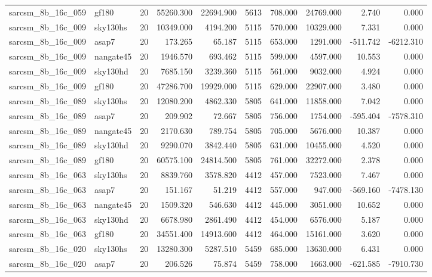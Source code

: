 \documentclass{article}
\begin{document}
\begin{longtable}{llrrrrrrrr}
sarcsm\_8b\_16c\_059 & gf180 & 20 & 55260.300 & 22694.900 & 5613 & 708.000 & 24769.000 & 2.740 & 0.000 \\
sarcsm\_8b\_16c\_009 & sky130hs & 20 & 10349.000 & 4194.200 & 5115 & 570.000 & 10329.000 & 7.331 & 0.000 \\
sarcsm\_8b\_16c\_009 & asap7 & 20 & 173.265 & 65.187 & 5115 & 653.000 & 1291.000 & -511.742 & -6212.310 \\
sarcsm\_8b\_16c\_009 & nangate45 & 20 & 1946.570 & 693.462 & 5115 & 599.000 & 4597.000 & 10.553 & 0.000 \\
sarcsm\_8b\_16c\_009 & sky130hd & 20 & 7685.150 & 3239.360 & 5115 & 561.000 & 9032.000 & 4.924 & 0.000 \\
sarcsm\_8b\_16c\_009 & gf180 & 20 & 47286.700 & 19929.000 & 5115 & 629.000 & 22907.000 & 3.480 & 0.000 \\
sarcsm\_8b\_16c\_089 & sky130hs & 20 & 12080.200 & 4862.330 & 5805 & 641.000 & 11858.000 & 7.042 & 0.000 \\
sarcsm\_8b\_16c\_089 & asap7 & 20 & 209.902 & 72.667 & 5805 & 756.000 & 1754.000 & -595.404 & -7578.310 \\
sarcsm\_8b\_16c\_089 & nangate45 & 20 & 2170.630 & 789.754 & 5805 & 705.000 & 5676.000 & 10.387 & 0.000 \\
sarcsm\_8b\_16c\_089 & sky130hd & 20 & 9290.070 & 3842.440 & 5805 & 631.000 & 10455.000 & 4.520 & 0.000 \\
sarcsm\_8b\_16c\_089 & gf180 & 20 & 60575.100 & 24814.500 & 5805 & 761.000 & 32272.000 & 2.378 & 0.000 \\
sarcsm\_8b\_16c\_063 & sky130hs & 20 & 8839.760 & 3578.820 & 4412 & 457.000 & 7523.000 & 7.467 & 0.000 \\
sarcsm\_8b\_16c\_063 & asap7 & 20 & 151.167 & 51.219 & 4412 & 557.000 & 947.000 & -569.160 & -7478.130 \\
sarcsm\_8b\_16c\_063 & nangate45 & 20 & 1509.320 & 546.630 & 4412 & 445.000 & 3051.000 & 10.652 & 0.000 \\
sarcsm\_8b\_16c\_063 & sky130hd & 20 & 6678.980 & 2861.490 & 4412 & 454.000 & 6576.000 & 5.187 & 0.000 \\
sarcsm\_8b\_16c\_063 & gf180 & 20 & 34551.400 & 14913.600 & 4412 & 464.000 & 15161.000 & 3.620 & 0.000 \\
sarcsm\_8b\_16c\_020 & sky130hs & 20 & 13280.300 & 5287.510 & 5459 & 685.000 & 13630.000 & 6.431 & 0.000 \\
sarcsm\_8b\_16c\_020 & asap7 & 20 & 206.526 & 75.874 & 5459 & 758.000 & 1663.000 & -621.585 & -7910.730 \\

\end{longtable}
\end{document}
